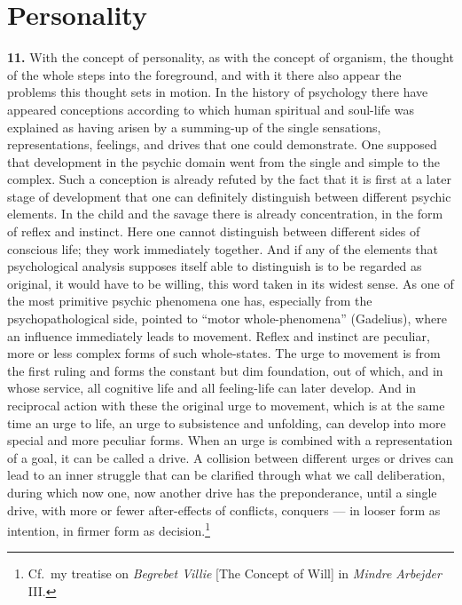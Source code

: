 \documentclass[12pt]{book}
\newcommand{\hnum}[1]{\textbf{#1.}\enspace}
\newcommand{\opage}[1]{\marginnote{\footnotesize\textit{[#1]}}}
\begin{document}
\chapter{Personality}
\label{ch:3}

\opage{34}\hnum{11} With the concept of personality, as with the concept of organism, the thought of the
whole steps into the foreground, and with it there also appear the problems this thought sets in
motion. In the history of psychology there have appeared conceptions according to which human
spiritual and soul-life was explained as having arisen by a summing-up of the single sensations,
representations, feelings, and drives that one could demonstrate. One supposed that development in
the psychic domain went from the single and simple to the complex. Such a conception is already
refuted by the fact that it is first at a later stage of development that one can definitely
distinguish between different psychic elements. In the child and the savage there is already
concentration, in the form of reflex and instinct. Here one cannot distinguish between different
sides of conscious life; they work immediately together. And if any of the elements that
psychological analysis supposes itself able to distinguish is to be regarded as original, it would
have to be willing, this word taken in its widest sense. As one of the most primitive psychic
phenomena one has, especially from the psychopathological side, pointed to ``motor
whole-phenomena'' (Gadelius), where an influence immediately leads to movement. Reflex and instinct
are peculiar, more or less complex forms of such whole-states. The urge to movement is from the
first ruling and forms the constant but dim foundation, out of which, and in whose \opage{35}service, all
cognitive life and all feeling-life can later develop. And in reciprocal action with these the
original urge to movement, which is at the same time an urge to life, an urge to subsistence and
unfolding, can develop into more special and more peculiar forms. When an urge is combined with a
representation of a goal, it can be called a drive. A collision between different urges or drives can
lead to an inner struggle that can be clarified through what we call deliberation, during which now
one, now another drive has the preponderance, until a single drive, with more or fewer
after-effects of conflicts, conquers --- in looser form as intention, in firmer form as
decision.\footnote{Cf.\ my treatise on \textit{Begrebet Villie} [The Concept of Will] in
\textit{Mindre Arbejder} III.}
\end{document}
